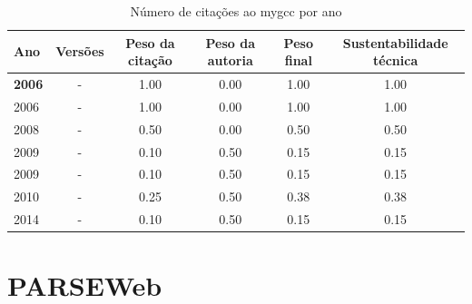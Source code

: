 \begin{table}[H]
\caption{Número de citações ao mygcc por ano}
\centering
\begin{tabular}{| l | c | c | c | c | c |}
  \hline
  Ano & Versões & Peso da citação & Peso da autoria & Peso final & Sustentabilidade técnica \\
  \hline
            {\bf 2006}
          &
          -
          &
          1.00
          &
          0.00
          &
          1.00
          &
            {\color{blue} 1.00}
          \\
            2006
          &
          -
          &
          1.00
          &
          0.00
          &
          1.00
          &
            {\color{blue} 1.00}
          \\
\hline
            2008
          &
          -
          &
          0.50
          &
          0.00
          &
          0.50
          &
            {\color{blue} 0.50}
          \\
\hline
            2009
          &
          -
          &
          0.10
          &
          0.50
          &
          0.15
          &
            {\color{red} 0.15}
          \\
            2009
          &
          -
          &
          0.10
          &
          0.50
          &
          0.15
          &
            {\color{red} 0.15}
          \\
\hline
            2010
          &
          -
          &
          0.25
          &
          0.50
          &
          0.38
          &
            {\color{red} 0.38}
          \\
\hline
            2014
          &
          -
          &
          0.10
          &
          0.50
          &
          0.15
          &
            {\color{red} 0.15}
          \\
\hline
\end{tabular}
\end{table}



\section{PARSEWeb}


